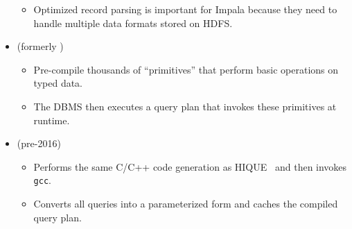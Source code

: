 \documentclass[11pt]{article}
\begin{document}
\begin{itemize}
\begin{itemize}
        \item
        Optimized record parsing is important for Impala because they need to handle multiple 
        data formats stored on HDFS.
    \end{itemize}
    
    \item {} (formerly )~\cite{raducanu13}
    \begin{itemize}
        \item
        Pre-compile thousands of ``primitives'' that perform basic operations on typed data.
        
        \item
        The DBMS then executes a query plan that invokes these primitives at runtime.
    \end{itemize}
    
    \item {} (pre-2016)
    \begin{itemize}
        \item
        Performs the same C/C++ code generation as HIQUE~\cite{krikellas10} and then invokes 
        \texttt{gcc}.
        
        \item
        Converts all queries into a parameterized form and caches the compiled query plan.
    \end{itemize}


\end{itemize}
\end{document}
